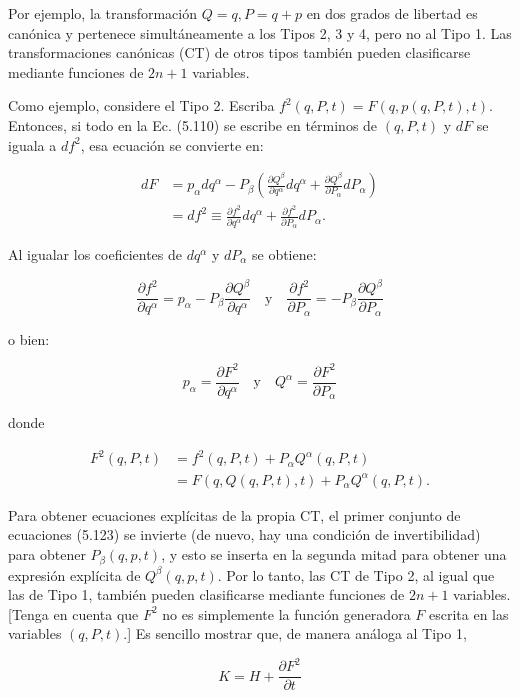 \begin{example}
  Por ejemplo, la transformación $Q=q, P=q+p$ en dos grados de libertad es canónica y pertenece simultáneamente a los Tipos 2, 3 y 4, pero no al Tipo 1. Las transformaciones canónicas (CT) de otros tipos también pueden clasificarse mediante funciones de $2n+1$ variables.  

Como ejemplo, considere el Tipo 2. Escriba $f^{2}(q, P, t)=F(q, p(q, P, t), t)$. Entonces, si todo en la Ec. (5.110) se escribe en términos de $(q, P, t)$ y $dF$ se iguala a $df^{2}$, esa ecuación se convierte en:  

$$
\begin{aligned}
d F & =p_{\alpha} d q^{\alpha}-P_{\beta}\left(\frac{\partial Q^{\beta}}{\partial q^{\alpha}} d q^{\alpha}+\frac{\partial Q^{\beta}}{\partial P_{\alpha}} d P_{\alpha}\right) \\
& =d f^{2} \equiv \frac{\partial f^{2}}{\partial q^{\alpha}} d q^{\alpha}+\frac{\partial f^{2}}{\partial P_{\alpha}} d P_{\alpha}.
\end{aligned}
$$  

Al igualar los coeficientes de $d q^{\alpha}$ y $d P_{\alpha}$ se obtiene:  

$$
\frac{\partial f^{2}}{\partial q^{\alpha}}=p_{\alpha}-P_{\beta} \frac{\partial Q^{\beta}}{\partial q^{\alpha}} \quad \text{y} \quad \frac{\partial f^{2}}{\partial P_{\alpha}}=-P_{\beta} \frac{\partial Q^{\beta}}{\partial P_{\alpha}}
$$  

o bien:  


\begin{equation*}
p_{\alpha}=\frac{\partial F^{2}}{\partial q^{\alpha}} \quad \text{y} \quad Q^{\alpha}=\frac{\partial F^{2}}{\partial P_{\alpha}} \tag{5.123}
\end{equation*}
 

donde  

$$
\begin{aligned}
F^{2}(q, P, t) & =f^{2}(q, P, t)+P_{\alpha} Q^{\alpha}(q, P, t) \\
& =F(q, Q(q, P, t), t)+P_{\alpha} Q^{\alpha}(q, P, t).
\end{aligned}
$$  

Para obtener ecuaciones explícitas de la propia CT, el primer conjunto de ecuaciones (5.123) se invierte (de nuevo, hay una condición de invertibilidad) para obtener $P_{\beta}(q, p, t)$, y esto se inserta en la segunda mitad para obtener una expresión explícita de $Q^{\beta}(q, p, t)$. Por lo tanto, las CT de Tipo 2, al igual que las de Tipo 1, también pueden clasificarse mediante funciones de $2n+1$ variables. [Tenga en cuenta que $F^{2}$ no es simplemente la función generadora $F$ escrita en las variables $(q, P, t)$.] Es sencillo mostrar que, de manera análoga al Tipo 1,  


\begin{equation*}
K=H+\frac{\partial F^{2}}{\partial t} \tag{5.124}
\end{equation*}
\end{example}

